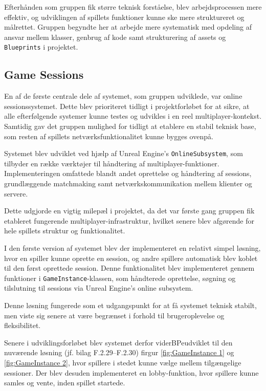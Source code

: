 Efterhånden som gruppen fik større teknisk forståelse, blev arbejdsprocessen mere effektiv, og udviklingen af spillets funktioner kunne ske mere struktureret og målrettet. Gruppen begyndte her at arbejde mere systematisk med opdeling af ansvar mellem klasser, genbrug af kode samt strukturering af assets og \texttt{Blueprints} i projektet.

\newpage
\subsection{Game Sessions}
En af de første centrale dele af systemet, som gruppen udviklede, var online sessionssystemet. Dette blev prioriteret tidligt i projektforløbet for at sikre, at alle efterfølgende systemer kunne testes og udvikles i en reel multiplayer-kontekst. Samtidig gav det gruppen mulighed for tidligt at etablere en stabil teknisk base, som resten af spillets netværksfunktionalitet kunne bygges ovenpå.

Systemet blev udviklet ved hjælp af Unreal Engine’s \texttt{OnlineSubsystem}, som tilbyder en række værktøjer til håndtering af multiplayer-funktioner. Implementeringen omfattede blandt andet oprettelse og håndtering af sessions, grundlæggende matchmaking samt netværkskommunikation mellem klienter og servere.

Dette udgjorde en vigtig milepæl i projektet, da det var første gang gruppen fik etableret fungerende multiplayer-infrastruktur, hvilket senere blev afgørende for hele spillets struktur og funktionalitet.

I den første version af systemet blev der implementeret en relativt simpel løsning, hvor en spiller kunne oprette en session, og andre spillere automatisk blev koblet til den først oprettede session. Denne funktionalitet blev implementeret gennem funktioner i \texttt{GameInstance}-klassen, som håndterede oprettelse, søgning og tilslutning til sessions via Unreal Engine’s online subsystem.

Denne løsning fungerede som et udgangspunkt for at få systemet teknisk stabilt, men viste sig senere at være begrænset i forhold til brugeroplevelse og fleksibilitet.

Senere i udviklingsforløbet blev systemet derfor viderBPeudviklet til den nuværende løsning (jf. bilag F.2.29--F.2.30) firgur \ref{fig:GameInstance 1} og \ref{fig:GameInstance 2}, hvor spillere i stedet kunne vælge mellem tilgængelige sessioner. Der blev desuden implementeret en lobby-funktion, hvor spillere kunne samles og vente, inden spillet startede.

